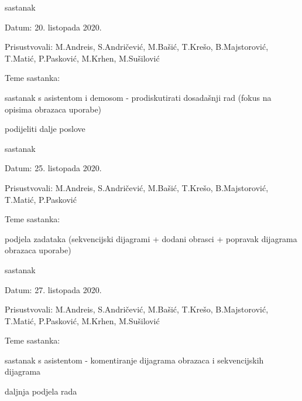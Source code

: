 \begin{packed_enum}
		\item  sastanak
		\item[] \begin{packed_item}
			\item Datum: 20. listopada 2020.
			\item Prisustvovali: M.Andreis, S.Andričević, M.Bašić, T.Krešo, B.Majstorović, T.Matić, P.Pasković, M.Krhen, M.Sušilović
			\item Teme sastanka:
			\begin{packed_item}
				\item  sastanak s asistentom i demosom - prodiskutirati dosadašnji rad (fokus na opisima obrazaca uporabe)
				\item  podijeliti dalje poslove
			\end{packed_item}
		\end{packed_item}
	
		\item  sastanak
		\item[] \begin{packed_item}
			\item Datum: 25. listopada 2020.
			\item Prisustvovali: M.Andreis, S.Andričević, M.Bašić, T.Krešo, B.Majstorović, T.Matić, P.Pasković
			\item Teme sastanka:
			\begin{packed_item}
				\item  podjela zadataka (sekvencijski dijagrami + dodani obrasci + popravak dijagrama obrazaca uporabe)
			\end{packed_item}
		\end{packed_item}
	
	\item  sastanak
	\item[] \begin{packed_item}
		\item Datum: 27. listopada 2020.
		\item Prisustvovali: M.Andreis, S.Andričević, M.Bašić, T.Krešo, B.Majstorović, T.Matić, P.Pasković, M.Krhen, M.Sušilović
		\item Teme sastanka:
		\begin{packed_item}
			\item  sastanak s asistentom - komentiranje dijagrama obrazaca i sekvencijskih dijagrama
			\item daljnja podjela rada
		\end{packed_item}
	\end{packed_item}


\end{packed_enum}
